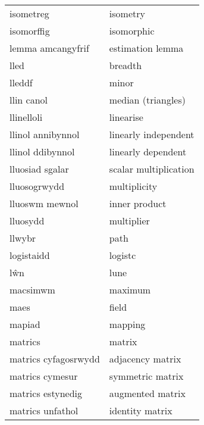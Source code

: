 \begin{supertabular}{p{0.22\textwidth}p{0.22\textwidth}}
                       isometreg &                          isometry \\
                      isomorffig &                        isomorphic \\
               lemma amcangyfrif &                  estimation lemma \\
                            lled &                           breadth \\
                          lleddf &                             minor \\
                      llin canol &                median (triangles) \\
                      llinelloli &                         linearise \\
               llinol annibynnol &              linearly independent \\
                llinol ddibynnol &                linearly dependent \\
                 lluosiad sgalar &             scalar multiplication \\
                    lluosogrwydd &                      multiplicity \\
                  lluoswm mewnol &                     inner product \\
                        lluosydd &                        multiplier \\
                          llwybr &                              path \\
                      logistaidd &                           logistc \\
                             lŵn &                              lune \\
                        macsimwm &                           maximum \\
                            maes &                             field \\
                          mapiad &                           mapping \\
                         matrics &                            matrix \\
            matrics cyfagosrwydd &                  adjacency matrix \\
                 matrics cymesur &                  symmetric matrix \\
               matrics estynedig &                  augmented matrix \\
                matrics unfathol &                   identity matrix \\

\end{supertabular}

